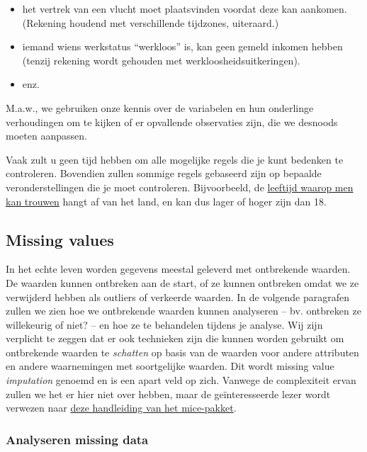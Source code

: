 \documentclass[]{tufte-book}
\providecommand{\tightlist}{%
  \setlength{\itemsep}{0pt}\setlength{\parskip}{0pt}}
\begin{document}
\begin{itemize}
\tightlist
\item
  het vertrek van een vlucht moet plaatsvinden voordat deze kan aankomen. (Rekening houdend met verschillende tijdzones, uiteraard.)
\item
  iemand wiens werkstatus ``werkloos'' is, kan geen gemeld inkomen hebben (tenzij rekening wordt gehouden met werkloosheidsuitkeringen).
\item
  enz.
\end{itemize}

M.a.w., we gebruiken onze kennis over de variabelen en hun onderlinge verhoudingen om te kijken of er opvallende observaties zijn, die we desnoods moeten aanpassen.

Vaak zult u geen tijd hebben om alle mogelijke regels die je kunt bedenken te controleren. Bovendien zullen sommige regels gebaseerd zijn op bepaalde veronderstellingen die je moet controleren. Bijvoorbeeld, de \href{https://en.wikipedia.org/wiki/Marriageable_age}{leeftijd waarop men kan trouwen} hangt af van het land, en kan dus lager of hoger zijn dan 18.

\hypertarget{missing-values}{%
\subsection{Missing values}\label{missing-values}}

In het echte leven worden gegevens meestal geleverd met ontbrekende waarden. De waarden kunnen ontbreken aan de start, of ze kunnen ontbreken omdat we ze verwijderd hebben als outliers of verkeerde waarden. In de volgende paragrafen zullen we zien hoe we ontbrekende waarden kunnen analyseren -- bv. ontbreken ze willekeurig of niet? -- en hoe ze te behandelen tijdens je analyse. Wij zijn verplicht te zeggen dat er ook technieken zijn die kunnen worden gebruikt om ontbrekende waarden te \emph{schatten} op basis van de waarden voor andere attributen en andere waarnemingen met soortgelijke waarden. Dit wordt missing value \emph{imputation} genoemd en is een apart veld op zich. Vanwege de complexiteit ervan zullen we het er hier niet over hebben, maar de geïnteresseerde lezer wordt verwezen naar \href{https://datascienceplus.com/imputing-missing-data-with-r-mice-package/}{deze handleiding van het mice-pakket}.

\hypertarget{analyseren-missing-data}{%
\subsubsection{Analyseren missing data}\label{analyseren-missing-data}}
\end{document}
